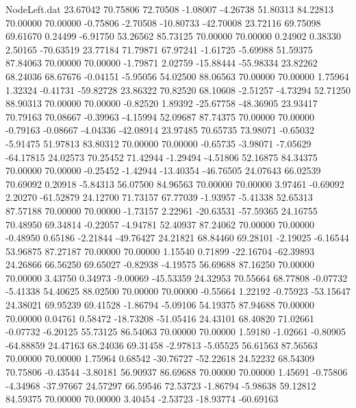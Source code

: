\begin{filecontents}{NodeLeft.dat}
  23.67042   70.75806   72.70508    -1.08007   -4.26738   51.80313   84.22813   70.00000   70.00000   -0.75806   -2.70508  -10.80733  -42.70008
  23.72116   69.75098   69.61670     0.24499   -6.91750   53.26562   85.73125   70.00000   70.00000    0.24902    0.38330    2.50165  -70.63519
  23.77184   71.79871   67.97241    -1.61725   -5.69988   51.59375   87.84063   70.00000   70.00000   -1.79871    2.02759  -15.88444  -55.98334
  23.82262   68.24036   68.67676    -0.04151   -5.95056   54.02500   88.06563   70.00000   70.00000    1.75964    1.32324   -0.41731  -59.82728
  23.86322   70.82520   68.10608    -2.51257   -4.73294   52.71250   88.90313   70.00000   70.00000   -0.82520    1.89392  -25.67758  -48.36905
  23.93417   70.79163   70.08667    -0.39963   -4.15994   52.09687   87.74375   70.00000   70.00000   -0.79163   -0.08667   -4.04336  -42.08914
  23.97485   70.65735   73.98071    -0.65032   -5.91475   51.97813   83.80312   70.00000   70.00000   -0.65735   -3.98071   -7.05629  -64.17815
  24.02573   70.25452   71.42944    -1.29494   -4.51806   52.16875   84.34375   70.00000   70.00000   -0.25452   -1.42944  -13.40354  -46.76505
  24.07643   66.02539   70.69092     0.20918   -5.84313   56.07500   84.96563   70.00000   70.00000    3.97461   -0.69092    2.20270  -61.52879
  24.12700   71.73157   67.77039    -1.93957   -5.41338   52.65313   87.57188   70.00000   70.00000   -1.73157    2.22961  -20.63531  -57.59365
  24.16755   70.48950   69.34814    -0.22057   -4.94781   52.40937   87.24062   70.00000   70.00000   -0.48950    0.65186   -2.21844  -49.76427
  24.21821   68.84460   69.28101    -2.19025   -6.16544   53.96875   87.27187   70.00000   70.00000    1.15540    0.71899  -22.16704  -62.39893
  24.26866   66.56250   69.65027    -0.82938   -4.19575   56.69688   87.16250   70.00000   70.00000    3.43750    0.34973   -9.00069  -45.53359
  24.32953   70.55664   68.77808    -0.07732   -5.41338   54.40625   88.02500   70.00000   70.00000   -0.55664    1.22192   -0.75923  -53.15647
  24.38021   69.95239   69.41528    -1.86794   -5.09106   54.19375   87.94688   70.00000   70.00000    0.04761    0.58472  -18.73208  -51.05416
  24.43101   68.40820   71.02661    -0.07732   -6.20125   55.73125   86.54063   70.00000   70.00000    1.59180   -1.02661   -0.80905  -64.88859
  24.47163   68.24036   69.31458    -2.97813   -5.05525   56.61563   87.56563   70.00000   70.00000    1.75964    0.68542  -30.76727  -52.22618
  24.52232   68.54309   70.75806    -0.43544   -3.80181   56.90937   86.69688   70.00000   70.00000    1.45691   -0.75806   -4.34968  -37.97667
  24.57297   66.59546   72.53723    -1.86794   -5.98638   59.12812   84.59375   70.00000   70.00000    3.40454   -2.53723  -18.93774  -60.69163

\end{filecontents}
